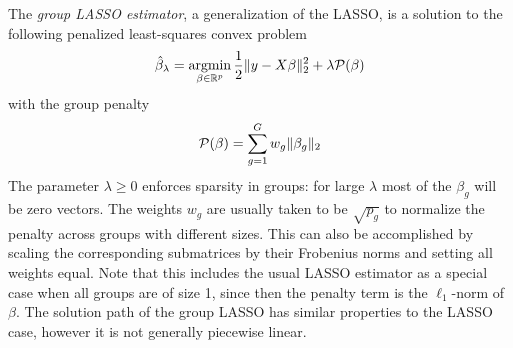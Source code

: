 \documentclass{imsart}
\newcommand{\argmin}{\mathop{\mathrm{argmin}}}
\newcommand{\real}{\mathbb{R}}
\begin{document}
The \emph{group LASSO estimator}, a generalization of the LASSO,
 is a solution to the following penalized
least-squares convex problem
\begin{equation}
\begin{aligned}
\label{eq:gsoln}
\displaystyle \hat \beta_\lambda = \argmin_{\beta \in \real^p} \frac{1}{2} \| y - X \beta \|_2^2 +
   \lambda {\cal P}(\beta) \\
\end{aligned}
\end{equation}
with the group penalty
\begin{equation}
  \begin{aligned}
  \label{eq:gpen}
    {\cal P}(\beta)&= \sum_{g=1}^G w_g \| \beta_g \|_2 \\
  \end{aligned}
\end{equation}
The parameter $\lambda \geq 0$ enforces sparsity in groups: for large
$\lambda$ most of the $\beta_g$ will be zero vectors. The weights
$w_g$ are usually taken to be $\sqrt {p_g}$ to normalize the penalty
across groups with different sizes.  This can also be accomplished
by scaling the corresponding submatrices by their Frobenius norms
and setting all weights equal.
Note that this includes the usual LASSO estimator as a
special case when all groups are of size 1, since then the
penalty term is the $\ell_1$-norm of $\beta$. The solution path of the group
LASSO has similar properties to the LASSO case, however it is not
generally piecewise linear.
\end{document}
